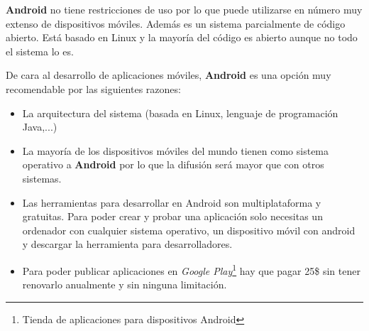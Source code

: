 \bigskip
\textbf{Android} no tiene restricciones de uso por lo que puede utilizarse en número muy extenso de dispositivos móviles. Además es un sistema parcialmente de código abierto. Está basado en Linux y la mayoría del código es abierto aunque no todo el sistema lo es.

\bigskip
De cara al desarrollo de aplicaciones móviles, \textbf{Android} es una opción muy recomendable por las siguientes razones:

\begin{itemize}
  \item La arquitectura del sistema (basada en Linux, lenguaje de programación Java,...)
  \item La mayoría de los dispositivos móviles del mundo tienen como sistema operativo a \textbf{Android} por lo que la difusión será mayor que con otros sistemas.
  \item Las herramientas para desarrollar en Android son multiplataforma y gratuitas. Para poder crear y probar una aplicación solo necesitas un ordenador con cualquier sistema operativo, un dispositivo móvil con android y descargar la herramienta para desarrolladores.
  \item Para poder publicar aplicaciones en \textit{Google Play}\footnote{Tienda de aplicaciones para dispositivos Android} hay que pagar 25\$ sin tener renovarlo anualmente y sin ninguna limitación.
\end{itemize}